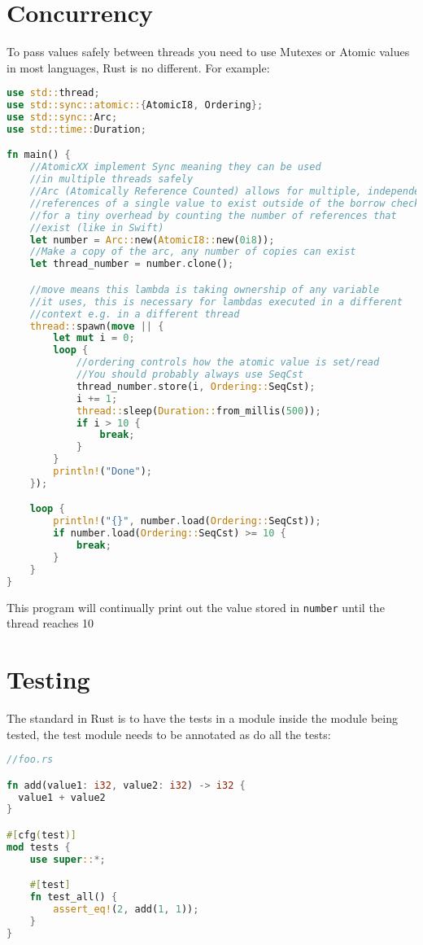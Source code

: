 \documentclass[a4paper,11pt]{article}
\begin{document}
\newpage
\section{Concurrency}

To pass values safely between threads you need to use Mutexes or Atomic values in most languages, Rust is no different. For example:
\begin{lstlisting}[language=Rust,frame=single]
use std::thread;
use std::sync::atomic::{AtomicI8, Ordering};
use std::sync::Arc;
use std::time::Duration;

fn main() {
    //AtomicXX implement Sync meaning they can be used 
    //in multiple threads safely
    //Arc (Atomically Reference Counted) allows for multiple, independent
    //references of a single value to exist outside of the borrow checker
    //for a tiny overhead by counting the number of references that
    //exist (like in Swift) 
    let number = Arc::new(AtomicI8::new(0i8));
    //Make a copy of the arc, any number of copies can exist
    let thread_number = number.clone();

    //move means this lambda is taking ownership of any variable
    //it uses, this is necessary for lambdas executed in a different
    //context e.g. in a different thread
    thread::spawn(move || {
        let mut i = 0;
        loop {
            //ordering controls how the atomic value is set/read
            //You should probably always use SeqCst
            thread_number.store(i, Ordering::SeqCst);
            i += 1;
            thread::sleep(Duration::from_millis(500));
            if i > 10 {
                break;
            }
        }
        println!("Done");
    });

    loop {
        println!("{}", number.load(Ordering::SeqCst));
        if number.load(Ordering::SeqCst) >= 10 {
            break;
        }
    }
}
\end{lstlisting}

This program will continually print out the value stored in \lstinline{number} until the thread reaches 10

\newpage
\section{Testing}
The standard in Rust is to have the tests in a module inside the module being tested, the test module needs to be annotated as do all the tests:
\begin{lstlisting}[language=Rust,frame=single]
//foo.rs 

fn add(value1: i32, value2: i32) -> i32 {
  value1 + value2
}

#[cfg(test)]
mod tests {
    use super::*;

    #[test]
    fn test_all() {
        assert_eq!(2, add(1, 1));
    }
}
\end{lstlisting}
\end{document}
